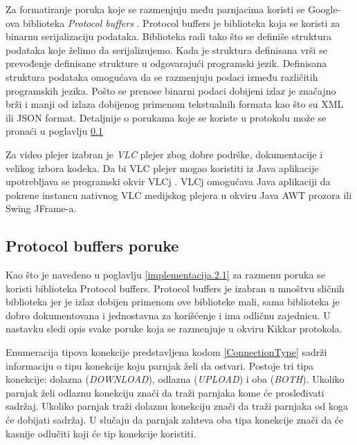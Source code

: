 \documentclass[12pt,oneside]{memoir}
\begin{document}
Za formatiranje poruka koje se razmenjuju među parnjacima koristi se Google-ova biblioteka \textit{Protocol buffers} \cite{ProtocolBuffers}. Protocol buffers je biblioteka koja se koristi za binarnu serijalizaciju podataka. Biblioteka radi tako što se definiše struktura podataka koje želimo da serijalizujemo. Kada je struktura definisana vrši se prevođenje definisane strukture u odgovarajući programski jezik. Definisana struktura podataka omogućava da se razmenjuju podaci između različitih programskih jezika. Pošto se prenose binarni podaci dobijeni izlaz je značajno brži i manji od izlaza dobijenog primenom tekstualnih formata kao što su XML ili JSON format. Detaljnije o porukama koje se koriste u protokolu može se pronaći u poglavlju \ref{implementacija.2.2} 

Za video plejer izabran je \textit{VLC} plejer \cite{VLC} zbog dobre podrške, dokumentacije i velikog izbora kodeka. Da bi VLC plejer mogao koristiti iz Java aplikacije upotrebljava se programski okvir VLCj \cite{VLCJ}. VLCj omogućava Java aplikaciji da pokrene instancu nativnog VLC medijskog plejera u okviru Java AWT prozora ili Swing JFrame-a.


\subsection{Protocol buffers poruke}
\label{implementacija.2.2}

Kao što je navedeno u poglavlju \ref{implementacija.2.1} za razmenu poruka se koristi biblioteka Protocol buffers. Protocol buffers je izabran u mnoštvu sličnih biblioteka jer je izlaz dobijen primenom ove biblioteke mali, sama biblioteka je dobro dokumentovana i jednostavna za korišćenje i ima odličnu zajednicu. U nastavku sledi opis svake poruke koja se razmenjuje u okviru Kikkar protokola.




Enumeracija tipova konekcije predstavljena kodom \ref{ConnectionType} sadrži informaciju o tipu konekcije koju parnjak želi da ostvari. Postoje tri tipa konekcije: dolazna (\textit{DOWNLOAD}), odlazna (\textit{UPLOAD}) i oba (\textit{BOTH}). Ukoliko parnjak želi odlaznu konekciju znači da traži parnjaka kome će prosleđivati sadržaj. Ukoliko parnjak traži dolaznu konekciju znači da traži parnjaka od koga će dobijati sadržaj. U slučaju da parnjak zahteva oba tipa konekcije znači da će kasnije odlučiti koji će tip konekcije koristiti.
\end{document}
